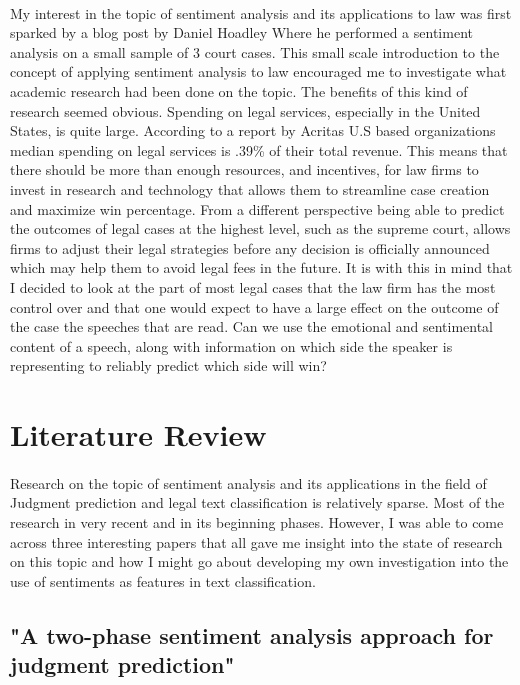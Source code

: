 \documentclass[12pt,english]{article}
\begin{document}
\paragraph{}
My interest in the topic of sentiment analysis and its applications to law was first sparked by a blog post by Daniel Hoadley Where he performed a sentiment analysis on a small sample of 3 court cases\citep{hoadley_daniel_sentiment_2017}. This small scale introduction to the concept of applying sentiment analysis to law encouraged me to investigate what academic research had been done on the topic. The benefits of this kind of research seemed obvious. Spending on legal services, especially in the United States, is quite large. According to a report by Acritas U.S based organizations median spending on legal services is .39\% of their total revenue\citep{Acritas_free_reports_2017}. This means that there should be more than enough resources, and incentives, for law firms to invest in research and technology that allows them to streamline case creation and maximize win percentage. From a different perspective being able to predict the outcomes of legal cases at the highest level, such as the supreme court, allows firms to adjust their legal strategies before any decision is officially announced which may help them to avoid legal fees in the future. It is with this in mind that I decided to look at the part of most legal cases that the law firm has the most control over and that one would expect to have a large effect on the outcome of the case the speeches that are read. Can we use the emotional and sentimental content of a speech, along with information on which side the speaker is representing to reliably predict which side will win?

\section{Literature Review}
\paragraph{}
Research on the topic of sentiment analysis and its applications in the field of Judgment prediction and legal text classification is relatively sparse. Most of the research in very recent and in its beginning phases. However, I was able to come across three interesting papers that all gave me insight into the state of research on this topic and how I might go about developing my own investigation into the use of sentiments as features in text classification. 
\subsection{"A two-phase sentiment analysis approach for judgment prediction"}
\end{document}

